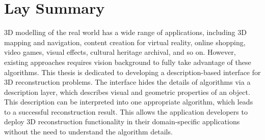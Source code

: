 
\chapter{Lay Summary}

3D modelling of the real world has a wide range of applications, including 3D mapping and navigation, content creation for virtual reality, online shopping, video games, visual effects, cultural heritage archival, and so on. However, existing approaches requires vision background to fully take advantage of these algorithms. This thesis is dedicated to developing a description-based interface for 3D reconstruction problems. The interface hides the details of algorithms via a description layer, which describes visual and geometric properties of an object. This description can be interpreted into one appropriate algorithm, which leads to a successful reconstruction result. This allows the application developers to deploy 3D reconstruction functionality in their domain-specific applications without the need to understand the algorithm details.